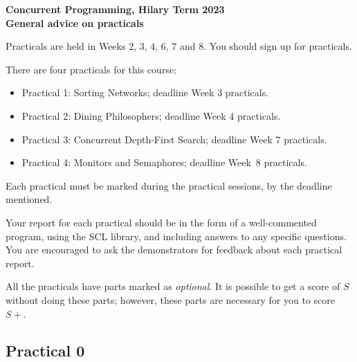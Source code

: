 \documentclass[12pt,a4paper]{article}
\begin{document}
\begin{center}
\Large\bf
Concurrent Programming, Hilary Term 2023 \\
General advice on practicals
\end{center}


Practicals are held in Weeks 2, 3, 4, 6, 7 and 8.  You should sign up
for practicals.

There are four practicals for this course:
%
\begin{itemize}
\item Practical 1: Sorting Networks; deadline Week 3 practicals.

\item Practical 2: Dining Philosophers; deadline Week 4 practicals.

\item Practical 3: Concurrent Depth-First Search; deadline Week 7
practicals.

\item Practical 4: Monitors and Semaphores; deadline Week~8
practicals.
\end{itemize}
%
Each practical must be marked during the practical sessions, by the deadline
mentioned.

Your report for each practical should be in the form of a well-commented
program, using the SCL library, and including answers to any specific
questions.  You are encouraged to ask the demonstrators for feedback about
each practical report.

All the practicals have parts marked as {\em optional}.  It is
possible to get a score of $S$ without doing these parts; however,
these parts are necessary for you to score $S+$.


\subsection*{Practical 0}
\end{document}
